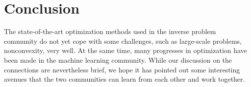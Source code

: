 \section{Conclusion}
\label{sec:conclusion}

The state-of-the-art optimization methods used in the inverse problem community
do not yet cope with some challenges, such as large-scale problems,
nonconvexity, very well.
At the same time, many progresses in optimization have been made in the machine
learning community.
While our discussion on the connections are nevertheless brief, we hope it has
pointed out some interesting avenues that the two communities can learn from
each other and work together.
